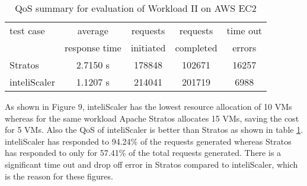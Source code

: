 \begin{table}[h!]
\centering
\caption{QoS summary for evaluation of Workload II on AWS EC2}
\label{table:analysis_qos_workload_5}
\begin{tabular}{|l|c|c|c|c|}
\hline

test case & average  & requests  & requests  & time out  \\
& response time & initiated & completed & errors \\ \hline

Stratos & 2.7150 s & 178848 & 102671 & 16257\\ \hline

inteliScaler & 1.1207 s & 214041 & 201719 & 6988\\ \hline

\end{tabular}
\end{table}

As shown in Figure 9, inteliScaler has the lowest resource allocation of 10 VMs whereas for the same workload Apache Stratos allocates 15 VMs, saving the cost for 5 VMs. Also the QoS of inteliScaler is better than Stratos as shown in table \ref{table:analysis_qos_workload_5}. inteliScaler has responded to 94.24\% of the requests generated whereas Stratos has responded to only for 57.41\% of the total requests generated. There is a significant time out and drop off error in Stratos compared to inteliScaler, which is the reason for these figures. 